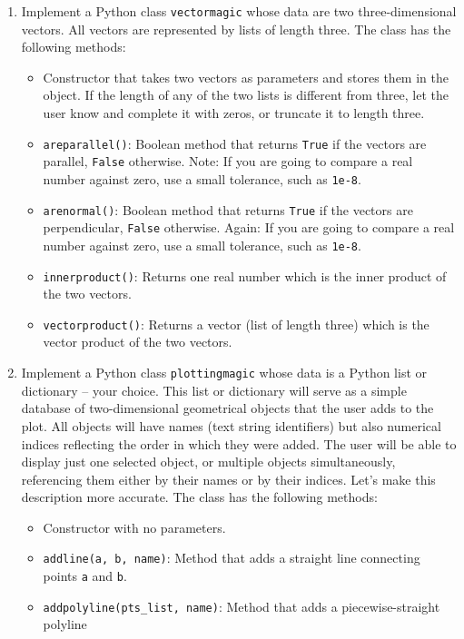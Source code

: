 \begin{enumerate}
\begin{itemize}
      {\tt False} otherwise.
\end{itemize}
\item Implement a Python class {\tt vectormagic} whose data are two three-dimensional vectors.
      All vectors are represented by lists of length three. The class has the following methods:
\begin{itemize}
\item Constructor that takes two vectors as parameters and stores them in the object. 
      If the length of any of the two lists is different from three, let the user know and 
      complete it with zeros, or truncate it to length three. 
\item {\tt areparallel()}: Boolean method that returns {\tt True} if the vectors are parallel,
      {\tt False} otherwise. Note: If you are going to compare a real number against zero,
      use a small tolerance, such as {\tt 1e-8}.
\item {\tt arenormal()}: Boolean method that returns {\tt True} if the vectors are perpendicular,
      {\tt False} otherwise. Again: If you are going to compare a real number against zero,
      use a small tolerance, such as {\tt 1e-8}.
\item {\tt innerproduct()}: Returns one real number which is the inner product of the two vectors.
\item {\tt vectorproduct()}: Returns a vector (list of length three) which is the vector product 
      of the two vectors.
\end{itemize}
\item Implement a Python class {\tt plottingmagic} whose data is a Python list or dictionary -- your choice. 
      This list or dictionary will serve as a simple database of two-dimensional geometrical objects that 
      the user adds to the plot. All objects will have names (text string identifiers) but also numerical 
      indices reflecting the order in which they were added. The user will be able to display just one 
      selected object, or multiple objects simultaneously, referencing them either by their names or by 
      their indices. Let's make this description more accurate. The class has the following methods:
\begin{itemize}
\item Constructor with no parameters.
\item {\tt addline(a, b, name)}: Method that adds a straight line connecting points {\tt a}
      and {\tt b}. 
\item {\tt addpolyline(pts\_list, name)}: Method that adds a piecewise-straight polyline 

\end{itemize}
\end{enumerate}
